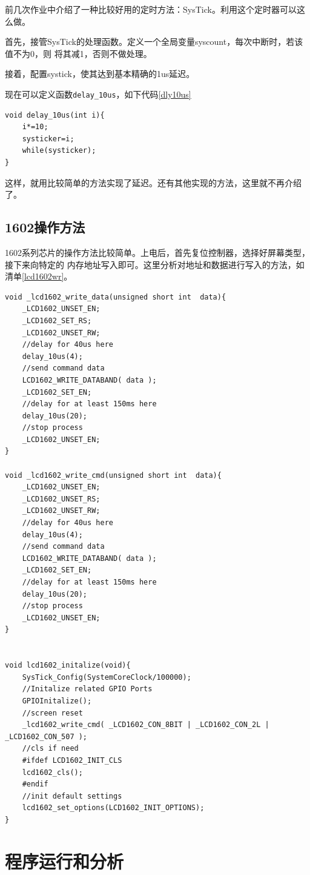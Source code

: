 \documentclass[a4paper]{ctexart}
\begin{document}
前几次作业中介绍了一种比较好用的定时方法：SysTick。利用这个定时器可以这么做。

首先，接管SysTick的处理函数。定义一个全局变量syscount，每次中断时，若该值不为0，则
将其减1，否则不做处理。

接着，配置systick，使其达到基本精确的1us延迟。

现在可以定义函数\lstinline{delay_10us}，如下代码\ref{dly10us}
\begin{lstlisting}[caption={Use SYSTICK to delay},label={dly10us}]
void delay_10us(int i){
	i*=10;
	systicker=i;
	while(systicker);
}
\end{lstlisting}

这样，就用比较简单的方法实现了延迟。还有其他实现的方法，这里就不再介绍了。

\subsection{1602操作方法}

1602系列芯片的操作方法比较简单。上电后，首先复位控制器，选择好屏幕类型，接下来向特定的
内存地址写入即可。这里分析对地址和数据进行写入的方法，如清单\ref{lcd1602wr}。
\begin{lstlisting}[caption={LCD1602 write and read},label={lcd1602wr}]
void _lcd1602_write_data(unsigned short int  data){
	_LCD1602_UNSET_EN;
	_LCD1602_SET_RS;
	_LCD1602_UNSET_RW;
	//delay for 40us here
	delay_10us(4);
	//send command data
	LCD1602_WRITE_DATABAND( data );
	_LCD1602_SET_EN;
	//delay for at least 150ms here
	delay_10us(20);
	//stop process
	_LCD1602_UNSET_EN;
}

void _lcd1602_write_cmd(unsigned short int  data){
	_LCD1602_UNSET_EN;
	_LCD1602_UNSET_RS;
	_LCD1602_UNSET_RW;
	//delay for 40us here
	delay_10us(4);
	//send command data
	LCD1602_WRITE_DATABAND( data );
	_LCD1602_SET_EN;
	//delay for at least 150ms here
	delay_10us(20);
	//stop process
	_LCD1602_UNSET_EN;
}


void lcd1602_initalize(void){
	SysTick_Config(SystemCoreClock/100000);
	//Initalize related GPIO Ports
	GPIOInitalize();
	//screen reset
	_lcd1602_write_cmd( _LCD1602_CON_8BIT | _LCD1602_CON_2L | _LCD1602_CON_507 );	
	//cls if need
	#ifdef LCD1602_INIT_CLS
	lcd1602_cls();
	#endif
	//init default settings
	lcd1602_set_options(LCD1602_INIT_OPTIONS);	
}
\end{lstlisting}

\section{程序运行和分析}
\end{document}
